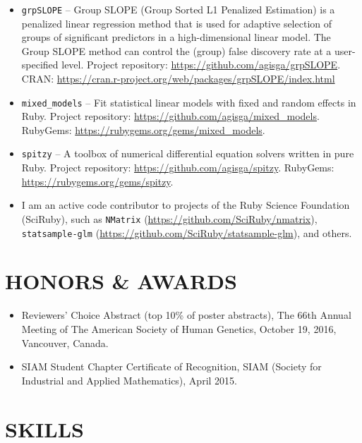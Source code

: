 \documentclass[margin]{res} %
\begin{document}
\begin{resume}
\begin{itemize} \itemsep -2pt %
    \item \verb!grpSLOPE! -- Group SLOPE (Group Sorted L1 Penalized Estimation) is a penalized linear regression method that is used for adaptive selection of groups of significant predictors in a high-dimensional linear model. The Group SLOPE method can control the (group) false discovery rate at a user-specified level. Project repository: \url{https://github.com/agisga/grpSLOPE}. CRAN: \url{https://cran.r-project.org/web/packages/grpSLOPE/index.html} 
    \item \verb!mixed_models! -- Fit statistical linear models with fixed and random effects in Ruby. Project repository: \url{https://github.com/agisga/mixed_models}. RubyGems: \url{https://rubygems.org/gems/mixed_models}.
    \item \verb!spitzy! -- A toolbox of numerical differential equation solvers written in pure Ruby. Project repository: \url{https://github.com/agisga/spitzy}. RubyGems: \url{https://rubygems.org/gems/spitzy}.
    \item I am an active code contributor to projects of the Ruby Science Foundation (SciRuby), such as \verb!NMatrix! (\url{https://github.com/SciRuby/nmatrix}), \verb!statsample-glm! (\url{https://github.com/SciRuby/statsample-glm}), and others.
\end{itemize}

\section{HONORS \& AWARDS}

\begin{itemize}
  \item Reviewers’ Choice Abstract (top 10\% of poster abstracts), The 66th Annual Meeting of The American Society of Human Genetics, October 19, 2016, Vancouver, Canada.
  \item SIAM Student Chapter Certificate of Recognition, SIAM (Society for Industrial and Applied Mathematics), April 2015.
\end{itemize}
 

\section{SKILLS} 


\end{resume}
\end{document}
